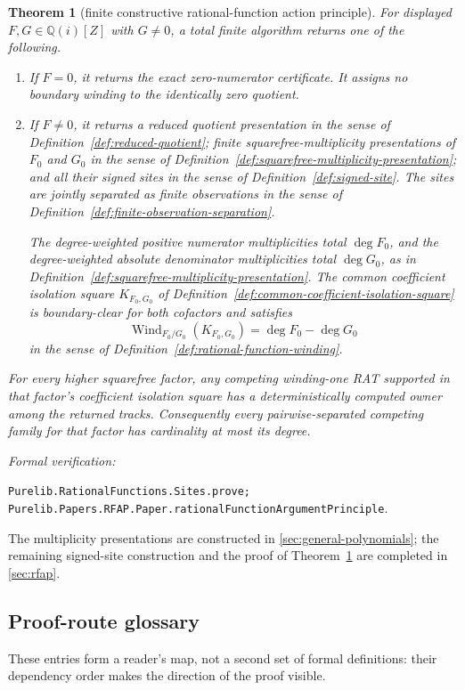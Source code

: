 \documentclass[11pt]{article}
\newtheorem{theorem}{Theorem}[section]
\newcommand{\Qi}{\mathbb{Q}(i)}
\newcommand{\Wind}{\operatorname{Wind}}
\newcommand{\Defref}[1]{Definition~\ref{#1}}
\newcommand{\Thmref}[1]{Theorem~\ref{#1}}
\newcommand{\leanref}[1]{\par\smallskip\noindent
  \emph{Formal verification:}\par\nobreak
  {\raggedright\nolinkurl{#1}.\par}}
\begin{document}
\begin{theorem}[finite constructive rational-function action principle]
\label{thm:rfap-general}
For displayed $F,G\in\Qi[Z]$ with $G\ne0$, a total finite algorithm returns
one of the following.
\begin{enumerate}[label=(\alph*)]
\item If $F=0$, it returns the exact zero-numerator certificate.  It assigns
no boundary winding to the identically zero quotient.
\item If $F\ne0$, it returns a reduced quotient presentation in the sense of
\Defref{def:reduced-quotient}; finite squarefree-multiplicity presentations
of $F_0$ and $G_0$ in the sense of
\Defref{def:squarefree-multiplicity-presentation}; and all their signed
sites in the sense of \Defref{def:signed-site}.  The sites are jointly
separated as finite observations in the sense of
\Defref{def:finite-observation-separation}.

The degree-weighted positive numerator multiplicities total $\deg F_0$, and
the degree-weighted absolute denominator multiplicities total $\deg G_0$, as in
\Defref{def:squarefree-multiplicity-presentation}.  The common coefficient
isolation square $K_{F_0,G_0}$ of
\Defref{def:common-coefficient-isolation-square} is boundary-clear for both
cofactors and satisfies
\[
             \Wind_{F_0/G_0}(K_{F_0,G_0})
                    =\deg F_0-\deg G_0
\]
in the sense of \Defref{def:rational-function-winding}.
\end{enumerate}
For every higher squarefree factor, any competing winding-one RAT supported
in that factor's coefficient isolation square has a deterministically
computed owner among the returned tracks.  Consequently every
pairwise-separated competing family for that factor has cardinality at most
its degree.
\end{theorem}

\leanref{Purelib.RationalFunctions.Sites.prove;
Purelib.Papers.RFAP.Paper.rationalFunctionArgumentPrinciple}

The multiplicity presentations are constructed in
\cref{sec:general-polynomials}; the remaining signed-site construction and
the proof of \Thmref{thm:rfap-general} are completed in \cref{sec:rfap}.

\subsection{Proof-route glossary}
\label{sec:proof-route-glossary}

These entries form a reader's map, not a second set of formal definitions:
their dependency order makes the direction of the proof visible.
\end{document}
